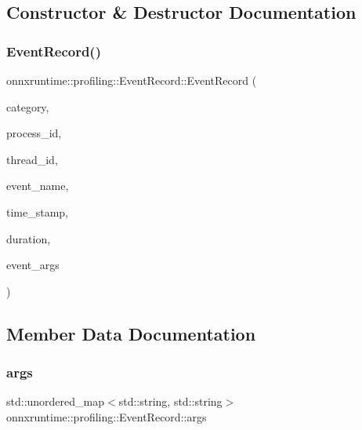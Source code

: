 \subsection{Constructor \& Destructor Documentation}
\mbox{\label{structonnxruntime_1_1profiling_1_1EventRecord_ab786e03ad54faa8f95d37e9e1ee481ca}} 
\subsubsection{\texorpdfstring{Event\+Record()}{EventRecord()}}
{\footnotesize\ttfamily onnxruntime\+::profiling\+::\+Event\+Record\+::\+Event\+Record (\begin{DoxyParamCaption}\item[{\mbox{\hyperlink{namespaceonnxruntime_1_1profiling_acbb1d7474c26b32c5bfef2ce1ab63734}{Event\+Category}}}]{category,  }\item[{int}]{process\+\_\+id,  }\item[{int}]{thread\+\_\+id,  }\item[{std\+::string}]{event\+\_\+name,  }\item[{long long}]{time\+\_\+stamp,  }\item[{long long}]{duration,  }\item[{std\+::unordered\+\_\+map$<$ std\+::string, std\+::string $>$ \&\&}]{event\+\_\+args }\end{DoxyParamCaption})\hspace{0.3cm}{\ttfamily [inline]}}



\subsection{Member Data Documentation}
\mbox{\label{structonnxruntime_1_1profiling_1_1EventRecord_a975e3dc6c02a05673ac3b770453365dc}} 
\subsubsection{\texorpdfstring{args}{args}}
{\footnotesize\ttfamily std\+::unordered\+\_\+map$<$std\+::string, std\+::string$>$ onnxruntime\+::profiling\+::\+Event\+Record\+::args}

